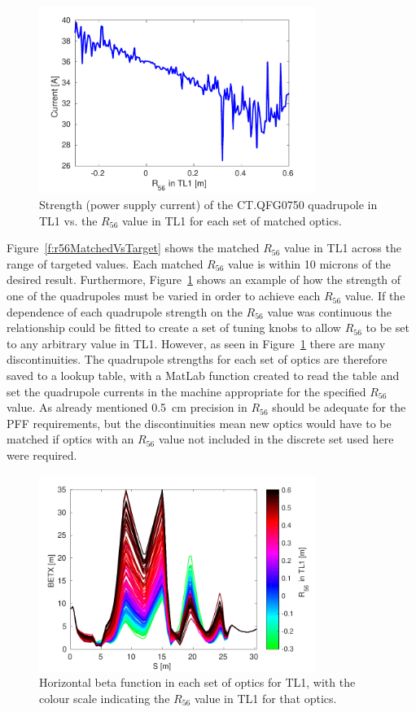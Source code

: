 \begin{figure}
  \centering
  \includegraphics[width=0.8\textwidth]{Figures/propagation/CTQFG0750}
  \caption{Strength (power supply current) of the CT.QFG0750 quadrupole in TL1 vs. the \(R_{56}\) value in TL1 for each set of matched optics.}
  \label{f:CTQFG0750}
\end{figure}

Figure~\ref{f:r56MatchedVsTarget} shows the matched \(R_{56}\) value in TL1 across the range of targeted values. Each matched \(R_{56}\) value is within 10 microns of the desired result. Furthermore, Figure~\ref{f:CTQFG0750}  shows an example of how the strength of one of the quadrupoles must be varied in order to achieve each \(R_{56}\) value. If the dependence of each quadrupole strength on the \(R_{56}\) value was continuous the relationship could be fitted to create a set of tuning knobs to allow \(R_{56}\) to be set to any arbitrary value in TL1. However, as seen in Figure~\ref{f:CTQFG0750} there are many discontinuities. The quadrupole strengths for each set of optics are therefore saved to a lookup table, with a MatLab function created to read the table and set the quadrupole currents in the machine appropriate for the specified \(R_{56}\) value. As already mentioned 0.5~cm precision in \(R_{56}\) should be adequate for the PFF requirements, but the discontinuities mean new optics would have to be matched if optics with an \(R_{56}\) value not included in the discrete set used here were required.

\begin{figure}
  \centering
  \includegraphics[width=0.8\textwidth]{Figures/propagation/BETX}
  \caption{Horizontal beta function in each set of optics for TL1, with the colour scale indicating the \(R_{56}\) value in TL1 for that optics.}
  \label{f:tl1BETX}
\end{figure}

